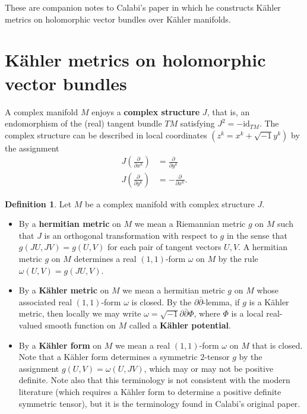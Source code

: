 \documentclass{article}
\numberwithin{equation}{section}
\theoremstyle{definition}
\newtheorem{definition}{Definition}[section]
\theoremstyle{theorem}
\newcommand{\ddb}{\partial\bar{\partial}}
\begin{document}
These are companion notes to Calabi's paper in which he constructs K\"ahler metrics on holomorphic vector bundles over K\"ahler manifolds. 

\section{K\"ahler metrics on holomorphic vector bundles}



A complex manifold $M$ enjoys a \textbf{complex structure} $J$, that is, an endomorphism of the (real) tangent bundle $TM$ satisfying $J^2 = -\text{id}_{TM}$. The complex structure can be described in local coordinates $(z^k = x^k + \sqrt{-1}y^k)$ by the assignment 
\begin{align*}
J\left(\frac{\partial}{\partial x^k}\right) &= \frac{\partial}{\partial y^k}\\
J\left(\frac{\partial}{\partial y^k}\right) &= - \frac{\partial}{\partial x^k}.
\end{align*}

\begin{definition}
Let $M$ be a complex manifold with complex structure $J$. 
\begin{itemize}
\item By a \textbf{hermitian metric} on $M$ we mean a Riemannian metric $g$ on $M$ such that $J$ is an orthogonal transformation with respect to $g$ in the sense that $g(JU, JV) = g(U,V)$ for each pair of tangent vectors $U,V$. A hermitian metric $g$ on $M$ determines a real $(1,1)$-form $\omega$ on $M$ by the rule $\omega(U,V) = g(JU,V)$. 
\item By a \textbf{K\"ahler metric} on $M$ we mean a hermitian metric $g$ on $M$ whose associated real $(1,1)$-form $\omega$ is closed. By the $\ddb$-lemma, if $g$ is a K\"ahler metric, then locally we may write $\omega = \sqrt{-1} \ddb \Phi$, where $\Phi$ is a local real-valued smooth function on $M$ called a \textbf{K\"ahler potential}. 
\item By a \textbf{K\"ahler form} on $M$ we mean a real $(1,1)$-form $\omega$ on $M$ that is closed. Note that a K\"ahler form determines a symmetric $2$-tensor $g$ by the assignment $g(U,V) = \omega(U, JV)$, which may or may not be positive definite. Note also that this terminology is not consistent with the modern literature (which requires a K\"ahler form to determine a positive definite symmetric tensor), but it is the terminology found in Calabi's original paper. 
\end{itemize}
\end{definition}
\end{document}
